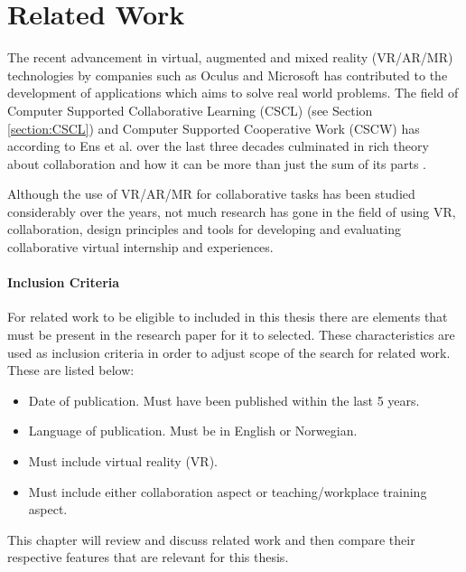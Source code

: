 
\chapter{Related Work}
\label{chap:relatedWork}
The recent advancement in virtual, augmented and mixed reality (VR/AR/MR) technologies by companies such as Oculus and Microsoft 
has contributed to the development of applications which aims to solve real world problems. The field of Computer Supported Collaborative Learning (CSCL) (see Section \ref{section:CSCL}) and Computer Supported Cooperative Work (CSCW) has according to Ens et al. over the last three decades culminated in rich theory about collaboration and how it can be more than just the sum of its parts \cite{ens2019revisiting}.

Although the use of VR/AR/MR for collaborative tasks has been studied considerably over the years, not much research has gone in the field of using VR, collaboration, design principles and tools for developing and evaluating collaborative virtual internship and experiences. 

\subsubsection{Inclusion Criteria}
\label{section:inclusionCriteria}
For related work to be eligible to included in this thesis there are elements that must be present in the research paper for it to selected. These characteristics are used as inclusion criteria in order to adjust scope of the search for related work. These are listed below:

\begin{itemize}
\label{itm:inclusionCriteria}
\setlength\itemsep{0em}
  \item Date of publication. Must have been published within the last 5 years.
  \item Language of publication. Must be in English or Norwegian.
  \item Must include virtual reality (VR).
  \item Must include either collaboration aspect or teaching/workplace training aspect.
\end{itemize}


This chapter will review and discuss related work and then compare their respective features that are relevant for this thesis. 





